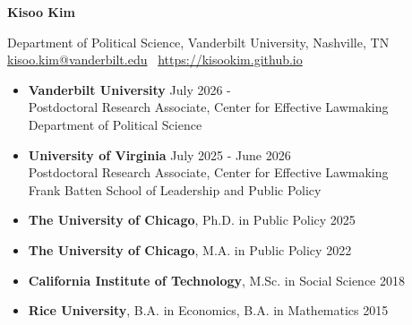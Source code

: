 \documentclass[11pt, Letter]{article}
\begin{document}
\begin{center}
\LARGE{\textbf{Kisoo Kim}}
\end{center}

\begin{center}
Department of Political Science, Vanderbilt University, Nashville, TN
    \\ \href{mailto:kisoo.kim@vanderbilt.edu}{kisoo.kim@vanderbilt.edu} \ \href{https://kisookim.github.io}{https://kisookim.github.io}
\end{center}


\vspace{3mm}

\begin{itemize}[leftmargin=47pt,itemindent=-21pt]
    \item[] \textbf{Vanderbilt University} \hfill July 2026 - \\
    Postdoctoral Research Associate, Center for Effective Lawmaking\\
    Department of Political Science
    \item[] \textbf{University of Virginia} \hfill July 2025 - June 2026\\
    Postdoctoral Research Associate, Center for Effective Lawmaking\\
    Frank Batten School of Leadership and Public Policy
\end{itemize}


\vspace{3mm}



\begin{itemize}[leftmargin=47pt,itemindent=-21pt]
    \item[] \textbf{The University of Chicago}, Ph.D. in Public Policy \hfill 2025
    \item[] \textbf{The University of Chicago}, M.A. in Public Policy \hfill 2022
    \item[] \textbf{California Institute of Technology}, M.Sc. in Social Science \hfill 2018
    \item[] \textbf{Rice University}, B.A. in Economics, B.A. in Mathematics  \hfill 2015
\end{itemize}

\vspace{3mm}
\end{document}
